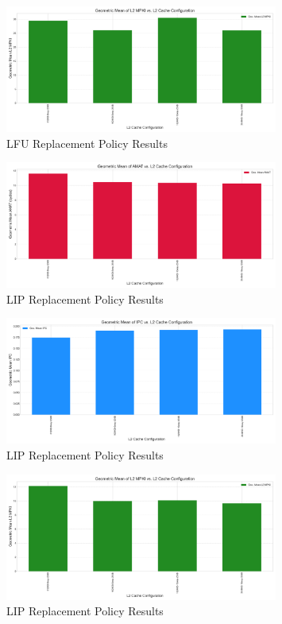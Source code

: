 \documentclass{article}
\begin{document}
\begin{figure}[H]
    \centering
    \includegraphics[width=0.8\textwidth]{figures/lfu/mpki_lfu.png}
    \caption{LFU Replacement Policy Results}
    \label{fig:lfu_mpki}
\end{figure}

\begin{figure}[H]
    \centering
    \includegraphics[width=0.8\textwidth]{figures/lip/amat_lip.png}
    \caption{LIP Replacement Policy Results}
    \label{fig:lip_amat}
\end{figure}

\begin{figure}[H]
    \centering
    \includegraphics[width=0.8\textwidth]{figures/lip/ipc_lip.png}
    \caption{LIP Replacement Policy Results}
    \label{fig:lip_ipc}
\end{figure}

\begin{figure}[H]
    \centering
    \includegraphics[width=0.8\textwidth]{figures/lip/mpki_lip.png}
    \caption{LIP Replacement Policy Results}
    \label{fig:lip_mpki}
\end{figure}
\end{document}
